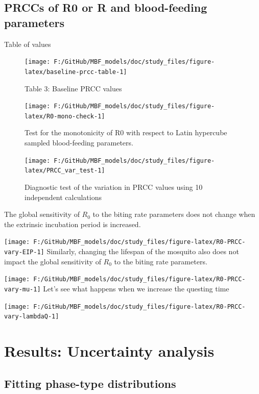 \documentclass[
]{article}
\begin{document}
\subsection{PRCCs of R0 or R and blood-feeding
parameters}\label{prccs-of-r0-or-r-and-blood-feeding-parameters}

Table of values

\begin{figure}[H]
\texttt{[image: F:/GitHub/MBF\_models/doc/study\_files/figure-latex/baseline-prcc-table-1]} \caption{Table 3: Baseline PRCC values}\label{fig:baseline-prcc-table}
\end{figure}

\begin{figure}[H]
\texttt{[image: F:/GitHub/MBF\_models/doc/study\_files/figure-latex/R0-mono-check-1]} \caption{Test for the monotonicity of R0 with respect to Latin hypercube sampled blood-feeding parameters.}\label{fig:R0-mono-check}
\end{figure}

\begin{figure}[H]
\texttt{[image: F:/GitHub/MBF\_models/doc/study\_files/figure-latex/PRCC\_var\_test-1]} \caption{Diagnostic test of the variation in PRCC values using 10 independent calculations}\label{fig:PRCC_var_test}
\end{figure}

The global sensitivity of \(R_0\) to the biting rate parameters does not
change when the extrinsic incubation period is increased.

\texttt{[image: F:/GitHub/MBF\_models/doc/study\_files/figure-latex/R0-PRCC-vary-EIP-1]}
Similarly, changing the lifespan of the mosquito also does not impact
the global sensitivity of \(R_0\) to the biting rate parameters.

\texttt{[image: F:/GitHub/MBF\_models/doc/study\_files/figure-latex/R0-PRCC-vary-mu-1]}
Let's see what happens when we increase the questing time

\texttt{[image: F:/GitHub/MBF\_models/doc/study\_files/figure-latex/R0-PRCC-vary-lambdaQ-1]}

\section{Results: Uncertainty
analysis}\label{results-uncertainty-analysis}

\subsection{Fitting phase-type
distributions}\label{fitting-phase-type-distributions}
\end{document}
